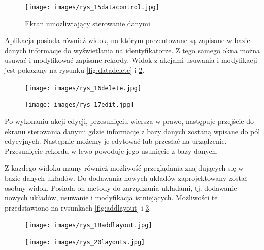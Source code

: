 \documentclass[a4paper,12pt, twoside]{article}
\begin{document}
    	\begin{figure}[H]
    	        \centering
    	        \vspace{.5cm}
    			\texttt{[image: images/rys\_15datacontrol.jpg]}
    			\vspace{.5cm}
    			\caption{Ekran umożliwiający sterowanie danymi}
                \label{fig:datacontrol}
    	\end{figure}
    	
    	\newpage
    	Aplikacja posiada również widok, na którym prezentowane są zapisane w bazie danych informacje do wyświetlania na identyfikatorze. Z tego samego okna można usuwać i modyfikować zapisane rekordy. Widok z akcjami usuwania i modyfikacji jest pokazany na rysunku \ref{fig:datadelete} i \ref{fig:dataedit}.
    	
    	\begin{figure}[H]
    	\vspace{.5cm}
    	\centering
    	\begin{minipage}{.5\textwidth}
    	    \centering
    	    \texttt{[image: images/rys\_16delete.jpg]}
            \label{fig:datadelete}
        \end{minipage}%
        \begin{minipage}{.5\textwidth}
            \centering
    	    \texttt{[image: images/rys\_17edit.jpg]}
            \label{fig:dataedit}
        \end{minipage}
    	\end{figure}
    	
    	Po wykonaniu akcji edycji, przesunięciu wiersza w prawo, następuje przejście do ekranu sterowania danymi gdzie informacje z bazy danych zostaną wpisane do pól edycyjnych. Następnie możemy je edytować lub przesłać na urządzenie. Przesunięcie rekordu w lewo powoduje jego usunięcie z bazy danych.
    	
    	\newpage
    	Z każdego widoku mamy również możliwość przeglądania znajdujących się w bazie danych układów. Do dodawania nowych układów zaprojektowany został osobny widok. Posiada on metody do zarządzania układami, tj. dodawanie nowych układów, usuwanie i modyfikacja istniejących. Możliwości te przedstawiono na rysunkach \ref{fig:addlayout} i \ref{fig:showlayout}. 
    	
    	
    	\begin{figure}[H]
    	\vspace{.5cm}
    	\centering
    	\begin{minipage}{.5\textwidth}
    	    \centering
    	    \texttt{[image: images/rys\_18addlayout.jpg]}
            \label{fig:addlayout}
        \end{minipage}%
        \begin{minipage}{.5\textwidth}
            \centering
    	    \texttt{[image: images/rys\_20layouts.jpg]}
            \label{fig:showlayout}
        \end{minipage}
    	\end{figure}
    	
\end{document}
